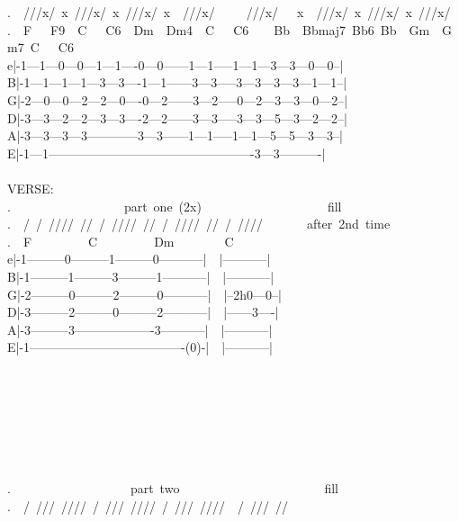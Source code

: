 {.\ \ ///x/\ x\ ///x/\ x\ ///x/\ x\ \ ///x/\ \ \ \ \ ///x/\ \ \ x\ \ ///x/\ x\ ///x/\ x\ ///x/\ \\
.\ \ F\ \ \ F9\ \ C\ \ \ C6\ \ Dm\ \ Dm4\ \ C\ \ \ C6\ \ \ \ Bb\ \ Bbmaj7\ Bb6\ Bb\ \ Gm\ \ Gm7\ C\ \ \ C6\ \ \ \\
e|-1---1---0---0---1---1----0---0------1---1-----1---1---3---3---0---0--|\\
B|-1---1---1---1---3---3----1---1------3---3-----3---3---3---3---1---1--|\\
G|-2---0---0---2---2---0----0---2------3---2-----0---2---3---3---0---2--|\\
D|-3---3---2---2---3---3----2---2------3---3-----3---3---5---3---2---2--|\\
A|-3---3---3---3------------3---3------1---1-----1---1---5---5---3---3--|\\
E|-1---1-------------------------------------------------3---3----------|\\
\\
VERSE:\\
.\ \ \ \ \ \ \ \ \ \ \ \ \ \ \ \ \ \ part\ one\ (2x)\ \ \ \ \ \ \ \ \ \ \ \ \ \ \ \ \ \ \ \ fill\\
.\ \ /\ /\ ////\ //\ /\ ////\ //\ /\ ////\ //\ /\ ////\ \ \ \ \ \ \ after\ 2nd\ time\\
.\ \ F\ \ \ \ \ \ \ \ \ C\ \ \ \ \ \ \ \ \ Dm\ \ \ \ \ \ \ \ C\\
e|-1---------0---------1---------0-----------|\ \ |-----------|\\
B|-1---------1---------3---------1-----------|\ \ |-----------|\\
G|-2---------0---------2---------0-----------|\ \ |--2h0---0--|\\
D|-3---------2---------0---------2-----------|\ \ |------3----|\\
A|-3---------3-------------------3-----------|\ \ |-----------|\\
E|-1-------------------------------------(0)-|\ \ |-----------|\\
\\
\\
\\
\\
\\
\\
\\
.\ \ \ \ \ \ \ \ \ \ \ \ \ \ \ \ \ \ \ part\ two\ \ \ \ \ \ \ \ \ \ \ \ \ \ \ \ \ \ \ \ \ \ \ fill\\
.\ \ /\ ///\ ////\ /\ ///\ ////\ /\ ///\ ////\ \ /\ ///\ //\\
}
